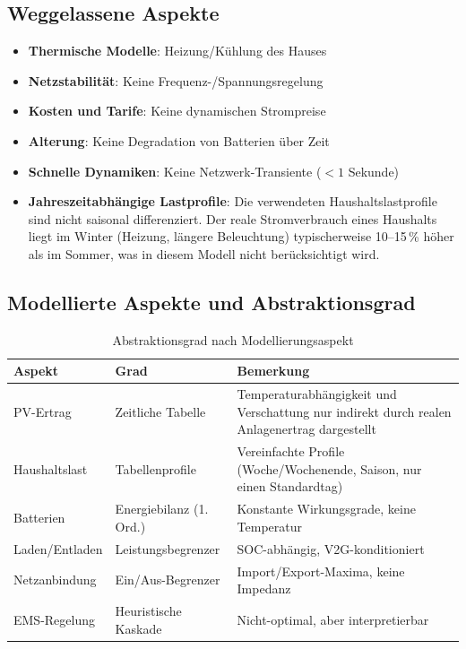 \documentclass[conference]{IEEEtran}
\begin{document}
\subsection{Weggelassene Aspekte}

\begin{itemize}
\item \textbf{Thermische Modelle}: Heizung/Kühlung des Hauses
\item \textbf{Netzstabilität}: Keine Frequenz-/Spannungsregelung
\item \textbf{Kosten und Tarife}: Keine dynamischen Strompreise
\item \textbf{Alterung}: Keine Degradation von Batterien über Zeit
\item \textbf{Schnelle Dynamiken}: Keine Netzwerk-Transiente ($< 1$ Sekunde)
\item \textbf{Jahreszeitabhängige Lastprofile}: Die verwendeten Haushaltslastprofile sind nicht saisonal differenziert. Der reale Stromverbrauch eines Haushalts liegt im Winter (Heizung, längere Beleuchtung) typischerweise 10--15\,\% höher als im Sommer, was in diesem Modell nicht berücksichtigt wird.
\end{itemize}

\subsection{Modellierte Aspekte und Abstraktionsgrad}

\begin{table}[h]
\caption{Abstraktionsgrad nach Modellierungsaspekt}
\centering
\footnotesize
\begin{tabularx}{\columnwidth}{@{}p{1.8cm}p{2.0cm}X@{}}
\toprule
\textbf{Aspekt} & \textbf{Grad} & \textbf{Bemerkung} \\
\midrule
PV-Ertrag & Zeitliche Tabelle & Temperaturabhängigkeit und Verschattung nur indirekt durch realen Anlagenertrag dargestellt \\
Haushaltslast & Tabellenprofile & Vereinfachte Profile (Woche/Wochenende, Saison, nur einen Standardtag) \\
Batterien & Energiebilanz (1. Ord.) & Konstante Wirkungsgrade, keine Temperatur \\
Laden/Entladen & Leistungsbegrenzer & SOC-abhängig, V2G-konditioniert \\
Netzanbindung & Ein/Aus-Begrenzer & Import/Export-Maxima, keine Impedanz \\
EMS-Regelung & Heuristische Kaskade & Nicht-optimal, aber interpretierbar \\
\bottomrule
\end{tabularx}
\end{table}
\end{document}
